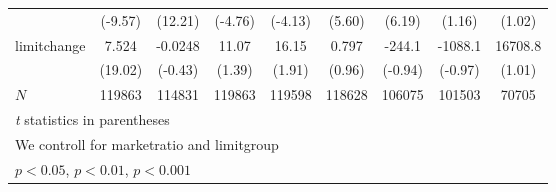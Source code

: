 {\begin{tabular}{l*{8}{c}}
            &     (-9.57)         &     (12.21)         &     (-4.76)         &     (-4.13)         &      (5.60)         &      (6.19)         &      (1.16)         &      (1.02)         \\
[1em]
limitchange &       7.524\sym{***}&     -0.0248         &       11.07         &       16.15         &       0.797         &      -244.1         &     -1088.1         &     16708.8         \\
            &     (19.02)         &     (-0.43)         &      (1.39)         &      (1.91)         &      (0.96)         &     (-0.94)         &     (-0.97)         &      (1.01)         \\
\hline
\(N\)       &      119863         &      114831         &      119863         &      119598         &      118628         &      106075         &      101503         &       70705         \\
\hline\hline
\multicolumn{9}{l}{\footnotesize \textit{t} statistics in parentheses}\\
\multicolumn{9}{l}{\footnotesize We controll for marketratio and limitgroup}\\
\multicolumn{9}{l}{\footnotesize \sym{*} \(p<0.05\), \sym{**} \(p<0.01\), \sym{***} \(p<0.001\)}\\
\end{tabular}
}
